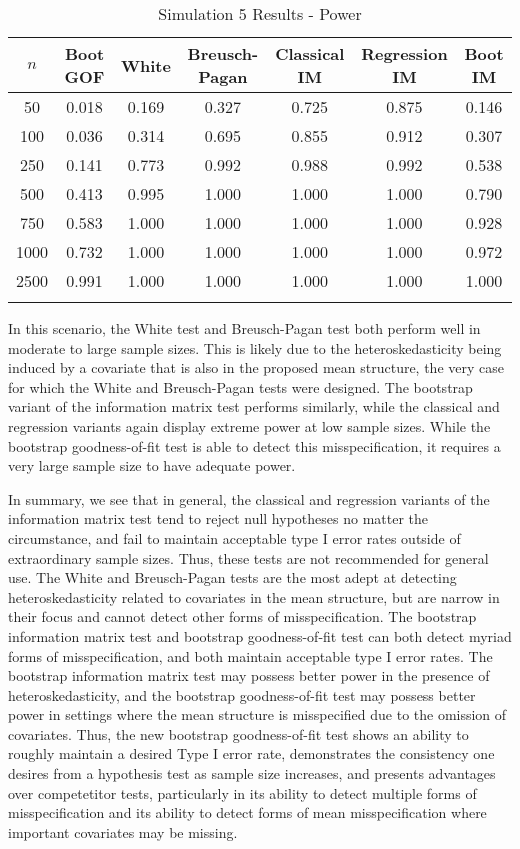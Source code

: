 \documentclass[sn-mathphys-ay]{sn-jnl}
\begin{document}
\begin{table}[h]
\caption{Simulation 5 Results - Power}\label{sim5tab}%
\begin{tabular}{ c|c|c|c|c|c|c}
\toprule
$n$ & Boot GOF & White & Breusch-Pagan & Classical IM & Regression IM & Boot IM \\
\midrule
50 & 0.018 & 0.169 & 0.327 & 0.725 & 0.875 & 0.146 \\
100 & 0.036 & 0.314 & 0.695 & 0.855 & 0.912 & 0.307 \\
250 & 0.141 & 0.773 & 0.992 & 0.988 & 0.992 & 0.538 \\
500 & 0.413 & 0.995 & 1.000 & 1.000 & 1.000 & 0.790 \\
750 & 0.583 & 1.000 & 1.000 & 1.000 & 1.000 & 0.928 \\
1000 & 0.732 & 1.000 & 1.000 & 1.000 & 1.000 & 0.972 \\
2500 & 0.991 & 1.000 & 1.000 & 1.000 & 1.000 & 1.000 \\
\botrule
\end{tabular}

\end{table}

In this scenario, the White test and Breusch-Pagan test both perform well in moderate to large sample sizes. This is likely due to the heteroskedasticity being induced by a covariate that is also in the 
proposed mean structure, the very case for which the White and Breusch-Pagan tests were designed. The bootstrap variant of the information matrix test performs similarly, while the classical and regression
variants again display extreme power at low sample sizes. While the bootstrap goodness-of-fit test is able to detect this misspecification, it requires a very large sample size to have adequate power.

In summary, we see that in general, the classical and regression variants of the information matrix test tend to reject null hypotheses no matter the circumstance, and fail to maintain
acceptable type I error rates outside of extraordinary sample sizes. Thus, these tests are not recommended for general use. The White and Breusch-Pagan tests are the most adept at
detecting heteroskedasticity related to covariates in the mean structure, but are narrow in their focus and cannot detect other forms of misspecification. The bootstrap information
matrix test and bootstrap goodness-of-fit test can both detect myriad forms of misspecification, and both maintain acceptable type I error rates. The bootstrap information matrix
test may possess better power in the presence of heteroskedasticity, and the bootstrap goodness-of-fit test may possess better power in settings where the mean structure is
misspecified due to the omission of covariates. Thus, the new bootstrap goodness-of-fit test shows an ability to roughly maintain a desired Type I error rate,
demonstrates the consistency one desires from a hypothesis test as sample size increases, and presents advantages over competetitor tests, particularly in its ability to detect
multiple forms of misspecification and its ability to detect forms of mean misspecification where important covariates may be missing.
\end{document}
